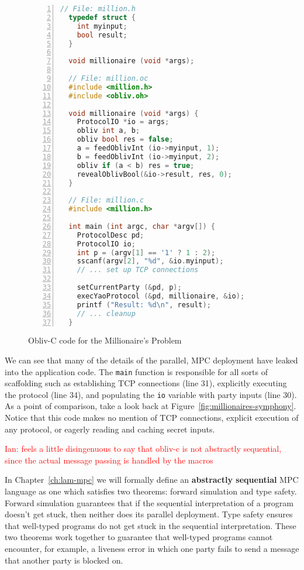 \documentclass{report}
\newcommand{\ins}[1]{\textcolor{red}{Ian: #1}}
\begin{document}
\begin{figure}[h]
\begin{lstlisting}[language=c,basicstyle=\footnotesize\ttfamily,numbers=left,stepnumber=1]
  // File: million.h
  typedef struct {
    int myinput;
    bool result;
  }

  void millionaire (void *args);

  // File: million.oc
  #include <million.h>
  #include <obliv.oh>

  void millionaire (void *args) {
    ProtocolIO *io = args;
    obliv int a, b;
    obliv bool res = false;
    a = feedOblivInt (io->myinput, 1);
    b = feedOblivInt (io->myinput, 2);
    obliv if (a < b) res = true;
    revealOblivBool(&io->result, res, 0);
  }

  // File: million.c
  #include <million.h>

  int main (int argc, char *argv[]) {
    ProtocolDesc pd;
    ProtocolIO io;
    int p = (argv[1] == '1' ? 1 : 2);
    sscanf(argv[2], "%d", &io.myinput);
    // ... set up TCP connections

    setCurrentParty (&pd, p);
    execYaoProtocol (&pd, millionaire, &io);
    printf ("Result: %d\n", result);
    // ... cleanup
  }
\end{lstlisting}
\caption{Obliv-C code for the Millionaire's Problem}
\label{fig:millionaires-oblivc}
\end{figure}

We can see that many of the details of the parallel, MPC deployment have leaked into the application code. The
\lstinline[language=c,basicstyle=\ttfamily]{main} function is responsible for all sorts of scaffolding such as establishing TCP connections (line 31),
explicitly executing the protocol (line 34), and populating the \lstinline[language=c,basicstyle=\ttfamily]{io} variable with party inputs (line 30). As
a point of comparison, take a look back at Figure~\ref{fig:millionaires-symphony}. Notice that this code makes no mention of TCP connections,
explicit execution of any protocol, or eagerly reading and caching secret inputs.

\ins{feels a little disingenuous to say that obliv-c is not
  abstractly sequential, since the actual message passing is handled by the macros}

In Chapter~\ref{ch:lam-mpc} we will formally define an \textbf{abstractly sequential} MPC language as one which satisfies two theorems:
forward simulation and type safety. Forward simulation guarantees that if the sequential interpretation of a program doesn't get stuck,
then neither does its parallel deployment. Type safety ensures that well-typed programs do not get stuck in the sequential interpretation.
These two theorems work together to guarantee that well-typed programs cannot encounter, for example, a liveness error in which one party
fails to send a message that another party is blocked on.
\end{document}
